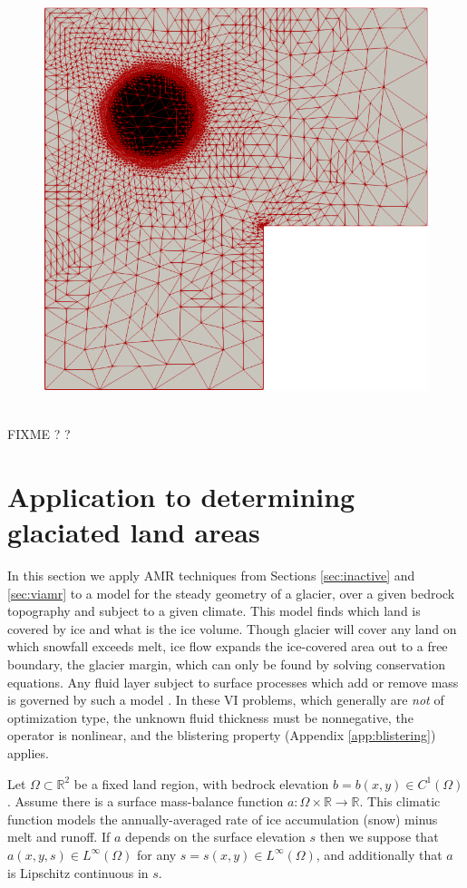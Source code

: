 \documentclass[]{interact}
\theoremstyle{plain}%
\theoremstyle{definition}
\theoremstyle{remark}
\newcommand{\RR}{\mathbb{R}}
\begin{document}
\begin{figure}[ht]
\centering
\mbox{
\includegraphics[width = .70\textwidth]{meshfigs/lshaped.png}
}
\caption{}
\label{fig:lshapedmeshfig}
\end{figure}









FIXME \cite{Kosub2016}? \cite{Pratt1991}?


\section{Application to determining glaciated land areas} \label{sec:app}

In this section we apply AMR techniques from Sections \ref{sec:inactive} and \ref{sec:viamr} to a model for the steady geometry of a glacier, over a given bedrock topography and subject to a given climate.  This model finds which land is covered by ice and what is the ice volume.  Though glacier will cover any land on which snowfall exceeds melt, ice flow expands the ice-covered area out to a free boundary, the glacier margin, which can only be found by solving conservation equations.  Any fluid layer subject to surface processes which add or remove mass is governed by such a model \cite{Bueler2021b}.  In these VI problems, which generally are \emph{not} of optimization type, the unknown fluid thickness must be nonnegative, the operator is nonlinear, and the blistering property (Appendix \ref{app:blistering}) applies.

Let $\Omega \subset \RR^2$ be a fixed land region, with bedrock elevation $b=b(x,y) \in C^1(\Omega)$.  Assume there is a surface mass-balance \cite{GreveBlatter2009} function $a:\Omega \times \RR \to \RR$.  This climatic function models the annually-averaged rate of ice accumulation (snow) minus melt and runoff.  If $a$ depends on the surface elevation $s$ then we suppose that $a(x,y,s)\in L^\infty(\Omega)$ for any $s=s(x,y) \in L^\infty(\Omega)$, and additionally that $a$ is Lipschitz continuous in $s$.
\end{document}
